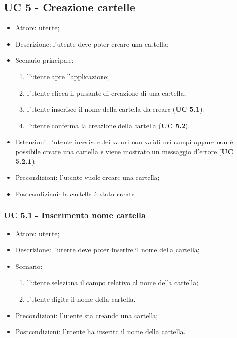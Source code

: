     \subsection{UC 5 - Creazione cartelle}
    \begin{itemize}
        \item Attore: utente;
        \item Descrizione: l'utente deve poter creare una cartella;
        \item Scenario principale:
            \begin{enumerate}
            \item l’utente apre l’applicazione;
            \item l’utente clicca il pulsante di creazione di una cartella;
            \item l'utente inserisce il nome della cartella da creare (\textbf{UC 5.1});
            \item l'utente conferma la creazione della cartella (\textbf{UC 5.2}).            
            \end{enumerate}
        \item Estensioni: l'utente inserisce dei valori non validi nei campi oppure non è possibile creare una cartella e viene mostrato un messaggio d'errore (\textbf{UC 5.2.1});
        \item Precondizioni: l'utente vuole creare una cartella;
        \item Postcondizioni: la cartella è stata creata.
    \end{itemize}

    \subsubsection{UC 5.1 - Inserimento nome cartella}
    \begin{itemize}
        \item Attore: utente;
        \item Descrizione: l'utente deve poter inserire il nome della cartella;
        \item Scenario:
        \begin{enumerate}
        \item l'utente seleziona il campo relativo al nome della cartella;
        \item l'utente digita il nome della cartella.
        \end{enumerate}
        \item Precondizioni: l'utente sta creando una cartella;
        \item Postcondizioni: l'utente ha inserito il nome della cartella.
    \end{itemize}

